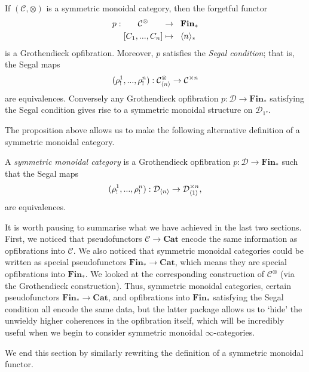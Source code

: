 \documentclass{MetricNotes2023}
\begin{document}
\begin{proposition}
If \((\mathcal{C}, \otimes)\) is a symmetric monoidal category, then the forgetful functor 
\begin{align*}
p : \quad\;\;\, \mathcal{C}^\otimes \quad\;\;\,&\to \;\;\textbf{Fin}_*\\
[C_1, ..., C_n] &\mapsto \;\;\langle n\rangle_*
\end{align*}
is a Grothendieck opfibration. Moreover, \(p\) satisfies the \textit{Segal condition}; that is, the Segal maps 
\[(\rho_!^1, ..., \rho_!^n) : \mathcal{C}^\otimes_{\langle n\rangle}\to \mathcal{C}^{\times n}\]
are equivalences. Conversely any Grothendieck opfibration \(p : \mathcal{D} \to \textbf{Fin}_*\) satisfying the Segal condition gives rise to a symmetric monoidal structure on \(\mathcal{D}_{\ang{1}}\).
\end{proposition}

The proposition above allows us to make the following alternative definition of a symmetric monoidal category.

\begin{definition}\label{def:newmonoidal}
A \textit{symmetric monoidal category} is a Grothendieck opfibration \(p : \mathcal{D}\to \textbf{Fin}_*\) such that the Segal maps
\[(\rho_!^1, ..., \rho_!^n) : \mathcal{D}_{\langle n\rangle}\to \mathcal{D}_{\langle1\rangle}^{\times n},\]
are equivalences.
\end{definition}

It is worth pausing to summarise what we have achieved in the last two sections. First, we noticed that pseudofunctors \(\mathcal{C}\to \textbf{Cat}\) encode the same information as opfibrations into \(\mathcal{C}\). We also noticed that symmetric monoidal categories could be written as special pseudofunctors \(\textbf{Fin}_* \to \textbf{Cat}\), which means they are special opfibrations into \(\textbf{Fin}_*\). We looked at the corresponding construction of \(\mathcal{C}^\otimes\) (via the Grothendieck construction). Thus, symmetric monoidal categories, certain pseudofunctors \(\textbf{Fin}_* \to \textbf{Cat}\), and opfibrations into \(\textbf{Fin}_*\) satisfying the Segal condition all encode the same data, but the latter package allows us to `hide' the unwieldy higher coherences in the opfibration itself, which will be incredibly useful when we begin to consider symmetric monoidal \(\infty\)-categories.

We end this section by similarly rewriting the definition of a symmetric monoidal functor. 
\end{document}
